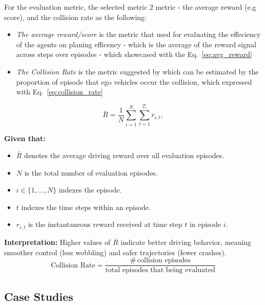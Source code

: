 For the evaluation metric, the selected metric 2 metric - the average reward (e.g score), and the collision rate as the following:
\begin{itemize}

\item \textit{The average reward/score} is the metric that \cite{ha_2018_world} used for evaluating the effeciency of the agents on planing efficency - which is the average of the reward signal across steps over episodes - which showcased with the Eq.~\eqref{eq:avg_reward}
\item \textit{The Collision Rate} is the metric suggested by \cite{gao_2024_cardreamer} which can be estimated by the proportion of episode that ego vehicles occur the collision, which expressed with Eq.~\eqref{eq:collision_rate}
\end{itemize}
\begin{equation}
\label{eq:avg_reward}
\bar{R}
=
\frac{1}{N}
\sum_{i=1}^{N}
\sum_{t=1}^{T_i}
r_{i,t},
\end{equation}

\noindent\textbf{Given that:}
\begin{itemize}
    \item $\bar{R}$ denotes the average driving reward over all evaluation episodes.
    \item $N$ is the total number of evaluation episodes.
    \item $i \in \{1, \dots, N\}$ indexes the episode.
    \item $t$ indexes the time steps within an episode.
    \item $r_{i,t}$ is the instantaneous reward received at time step $t$ in episode $i$.
\end{itemize}

\noindent\textbf{Interpretation:}
Higher values of $\bar{R}$ indicate better driving behavior, meaning smoother control (less wobbling)
and safer trajectories (fewer crashes).
\begin{equation}
\label{eq:collision_rate}
\text{Collision Rate}
=
\frac{\#\,\text{collision episodes}}
{\text{total episodes that being evaluated}}
\end{equation}


\subsection{Case Studies}
\label{sssec:casestudy}

